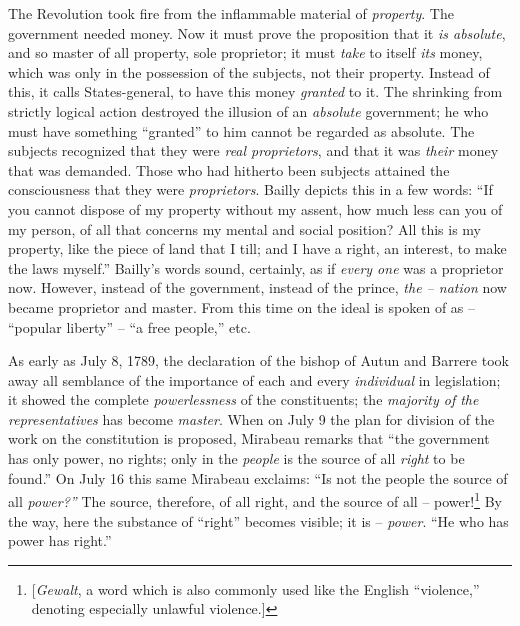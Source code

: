 The Revolution took fire from the inflammable material of \textit{property}. 
The government needed money. Now it must prove the proposition that it 
\textit{is absolute}, and so master of all property, sole proprietor; it must 
\textit{take} to itself \textit{its} money, which was only in the possession 
of the subjects, not their property. Instead of this, it calls States-general, 
to have this money \textit{granted} to it. The shrinking from strictly logical 
action destroyed the illusion of an \textit{absolute} government; he who must 
have something ``granted'' to him cannot be regarded as absolute. The 
subjects recognized that they were \textit{real proprietors}, and that it was 
\textit{their} money that was demanded. Those who had hitherto been subjects 
attained the consciousness that they were \textit{proprietors}. Bailly depicts 
this in a few words: ``If you cannot dispose of my property without my 
assent, how much less can you of my person, of all that concerns my mental and 
social position? All this is my property, like the piece of land that I till; 
and I have a right, an interest, to make the laws myself.'' Bailly's words 
sound, certainly, as if \textit{every one} was a proprietor now. However, 
instead of the government, instead of the prince, \textit{the -- nation} now 
became proprietor and master. From this time on the ideal is spoken of as -- 
``popular liberty'' -- ``a free people,'' etc.

As early as July 8, 1789, the declaration of the bishop of Autun and Barrere 
took away all semblance of the importance of each and every 
\textit{individual} in legislation; it showed the complete 
\textit{powerlessness} of the constituents; the \textit{majority of the 
representatives} has become \textit{master}. When on July 9 the plan for 
division of the work on the constitution is proposed, Mirabeau remarks that 
``the government has only power, no rights; only in the \textit{people} is 
the source of all \textit{right} to be found.'' On July 16 this same Mirabeau 
exclaims: ``Is not the people the source of all \textit{power?''} The 
source, therefore, of all right, and the source of all -- 
power!\footnote{[\textit{Gewalt}, a word which is also commonly used like the 
English ``violence,'' denoting especially unlawful violence.]} By the way, 
here the substance of ``right'' becomes visible; it is -- \textit{power}. 
``He who has power has right.''


